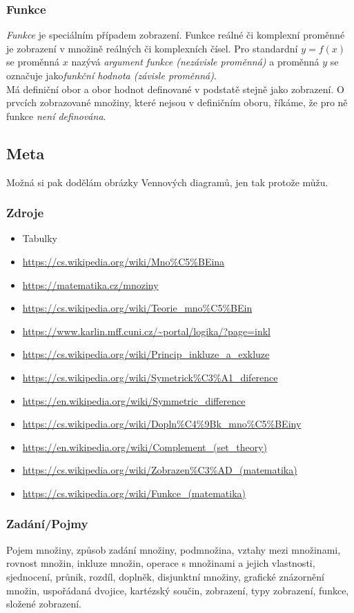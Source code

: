 \documentclass[12pt]{article}
\begin{document}
\subsubsection{Funkce}
\emph{Funkce} je speciálním případem zobrazení. Funkce reálné či komplexní proměnné je zobrazení v množině reálných či komplexních čísel. Pro standardní $y = f(x) $ se proměnná $x$ nazývá \emph{argument funkce (nezávisle proměnná)} a proměnná $y$ se označuje jako\emph{funkční hodnota (závisle proměnná)}.\\
Má definiční obor a obor hodnot definované v podstatě stejně jako zobrazení. O prvcích zobrazované množiny, které nejsou v definičním oboru, říkáme, že pro ně funkce \emph{není definována}.
\subsection{Meta}
Možná si pak dodělám obrázky Vennových diagramů, jen tak protože můžu.
\subsubsection{Zdroje}
\begin{itemize}
\item Tabulky
\item \url{https://cs.wikipedia.org/wiki/Mno\%C5\%BEina}
\item \url{https://matematika.cz/mnoziny}
\item \url{https://cs.wikipedia.org/wiki/Teorie_mno\%C5\%BEin}
\item \url{https://www.karlin.mff.cuni.cz/~portal/logika/?page=inkl}
\item \url{https://cs.wikipedia.org/wiki/Princip_inkluze_a_exkluze}
\item \url{https://cs.wikipedia.org/wiki/Symetrick\%C3\%A1_diference}
\item \url{https://en.wikipedia.org/wiki/Symmetric_difference}
\item \url{https://cs.wikipedia.org/wiki/Dopln\%C4\%9Bk_mno\%C5\%BEiny}
\item \url{https://en.wikipedia.org/wiki/Complement_(set_theory)}
\item \url{https://cs.wikipedia.org/wiki/Zobrazen\%C3\%AD_(matematika)}
\item \url{https://cs.wikipedia.org/wiki/Funkce_(matematika)}	
\end{itemize}
\subsubsection{Zadání/Pojmy}
Pojem množiny, způsob zadání množiny, podmnožina, vztahy mezi množinami, rovnost množin, inkluze množin, operace s množinami a jejich vlastnosti, sjednocení, průnik, rozdíl, doplněk, disjunktní množiny, grafické znázornění množin, uspořádaná dvojice, kartézský součin, zobrazení, typy zobrazení, funkce, složené zobrazení.
\end{document}
